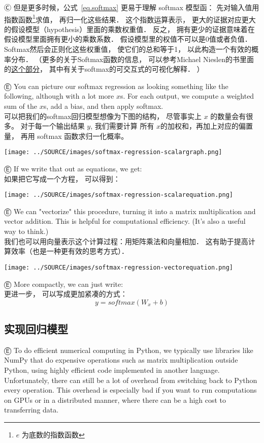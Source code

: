 Ⓒ 但是更多时候，公式~\ref{eq.softmax} 更易于理解 softmax 模型函： 先对输入值用指数函数\footnote{$e$ 为底数的指数函数}求值， 再归一化这些结果．  这个指数运算表示， 更大的证据对应更大的假设模型（hypothesis）里面的乘数权重值．  反之， 拥有更少的证据意味着在假设模型里面拥有更小的乘数系数．  假设模型里的权值不可以是0值或者负值．  Softmax然后会正则化这些权重值， 使它们的总和等于1， 以此构造一个有效的概率分布．  （更多的关于Softmax函数的信息， 可以参考Michael Nieslen的书里面的\href{http://neuralnetworksanddeeplearning.com/chap3.html#softmax}{这个部分}， 其中有关于softmax的可交互式的可视化解释．  ）

Ⓔ You can picture our softmax regression as looking something like the following, although with a lot more $x$s. For each output, we compute a weighted sum of the $x$s, add a bias, and then apply softmax.\\
可以把我们的softmax回归模型想像为下图的结构， 尽管事实上 $x$ 的数量会有很多。 对于每一个输出结果 $y$, 我们需要计算 所有 $x$的加权和，再加上对应的偏置量， 再用 softmax 函数求归一化概率。
\begin{center}
\texttt{[image: ../SOURCE/images/softmax-regression-scalargraph.png]}
\end{center}
Ⓔ If we write that out as equations, we get:\\
如果把它写成一个方程， 可以得到：
\begin{center}
\texttt{[image: ../SOURCE/images/softmax-regression-scalarequation.png]}
\end{center}
Ⓔ We can "vectorize" this procedure, turning it into a matrix multiplication and vector addition. This is helpful for computational efficiency. (It's also a useful way to think.)\\
我们也可以用向量表示这个计算过程：用矩阵乘法和向量相加．  这有助于提高计算效率（也是一种更有效的思考方式）．
\begin{center}
\texttt{[image: ../SOURCE/images/softmax-regression-vectorequation.png]}
\end{center}
Ⓔ More compactly, we can just write:\\
更进一步， 可以写成更加紧凑的方式：
\begin{equation}
y = softmax(W_x+b)
\end{equation}

\subsection {实现回归模型}
Ⓔ To do efficient numerical computing in Python, we typically use libraries like NumPy that do expensive operations such as matrix multiplication outside Python, using highly efficient code implemented in another language. Unfortunately, there can still be a lot of overhead from switching back to Python every operation. This overhead is especially bad if you want to run computations on GPUs or in a distributed manner, where there can be a high cost to transferring data.

